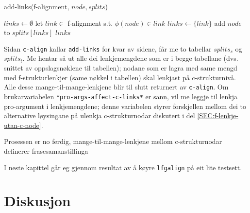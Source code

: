 \documentclass[11pt,a4paper,oneside,draft]{report}
\begin{document}
   \begin{algorithm}[]
   \caption{add-links(f-alignment, $node, splits$)}
   \label{algo:add-links}
      
        $links \gets \emptyset$\;
    {
        {
          let $link \in$ f-alignment s.t. $\phi(node) \in link$ \;
           {$links \gets \{link\}$} \;
           {
          }
        }
        add $node$ to $splits[links]$ \;
       }
        \Return $links$ \;
  \end{algorithm}

Sidan \texttt{c-align} kallar \texttt{add-links} for kvar av sidene, får me to
tabellar $splits_s$ og $splits_t$.  Me hentar så ut alle dei
lenkjemengdene som er i begge tabellane (dvs. snittet av
oppslagsnøklene til tabellen); nodane som er lagra med same mengd med
f-strukturlenkjer (same nøkkel i tabellen) skal lenkjast på
c-strukturnivå. Alle desse mange-til-mange-lenkjene blir til slutt
returnert av \texttt{c-align}. Om brukarvariabelen
\texttt{*pro-args-affect-c-links*} er sann, vil me leggje til lenkja
pro-argument i lenkjemengdene; denne variabelen styrer forskjellen
mellom dei to alternative løysingane på ulenkja c-strukturnodar
diskutert i del \ref{SEC:f-lenkje-utan-c-node}.

Prosessen er no ferdig, mange-til-mange-lenkjene mellom
c-strukturnodar definerer frasesamanstillinga

I neste kapittel går eg gjennom resultat av å køyre \texttt{lfgalign} på eit
lite testsett. 


\chapter{Diskusjon}
\label{sec-5}

\label{SEC:diskusjon}


\end{document}
